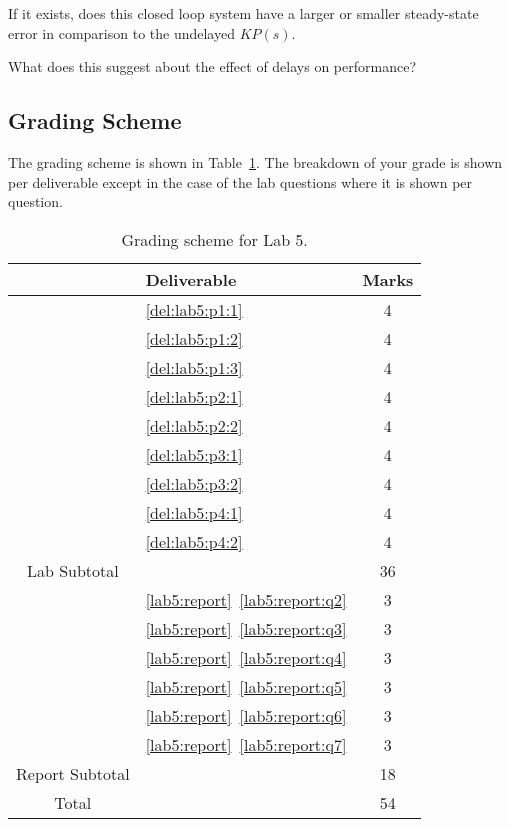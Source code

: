 \begin{deliverable}[label={lab5:report}]
\begin{enumerate}[label={(\arabic*)}]
{      If it exists, does this closed loop system have a larger or smaller steady-state error in comparison to the undelayed \(K P(s).\)

      What does this suggest about the effect of delays on performance?
      \label{lab5:report:q7}
    }
  \end{enumerate}
\end{deliverable}

\subsection{Grading Scheme}
The grading scheme is shown in Table~\ref{tab:lab5:grading}. The breakdown of
your grade is shown per deliverable except in the case of the lab
questions where it is shown per question.
%
\begin{table}
\centering
\begin{tabular}{c|l|c}
        & Deliverable           & Marks  \\ \hline
        & \ref{del:lab5:p1:1}         & 4       \\ \hline
        & \ref{del:lab5:p1:2}         & 4       \\ \hline
        & \ref{del:lab5:p1:3}         & 4      \\ \hline
        & \ref{del:lab5:p2:1}         & 4      \\ \hline
        & \ref{del:lab5:p2:2}         & 4       \\ \hline
        & \ref{del:lab5:p3:1}         & 4       \\ \hline
        & \ref{del:lab5:p3:2}         & 4       \\ \hline
        & \ref{del:lab5:p4:1}         & 4       \\ \hline
        & \ref{del:lab5:p4:2}         & 4       \\ \hhline{=|=|=}
Lab Subtotal&                       & 36      \\ \hhline{=|=|=}
        & \ref{lab5:report}~\ref{lab5:report:q2}  & 3       \\ \hline
        & \ref{lab5:report}~\ref{lab5:report:q3}  & 3       \\ \hline
        & \ref{lab5:report}~\ref{lab5:report:q4}  & 3      \\ \hline
        & \ref{lab5:report}~\ref{lab5:report:q5}  & 3      \\ \hline
        & \ref{lab5:report}~\ref{lab5:report:q6}  & 3      \\ \hline
        & \ref{lab5:report}~\ref{lab5:report:q7}  & 3      \\ \hhline{=|=|=}
Report Subtotal&  & 18 \\ \hhline{=|=|=}
  Total &                       & 54
\end{tabular}
\caption[Grading Scheme for Lab 5]{Grading scheme for Lab 5.}
\label{tab:lab5:grading}
\end{table}
%
